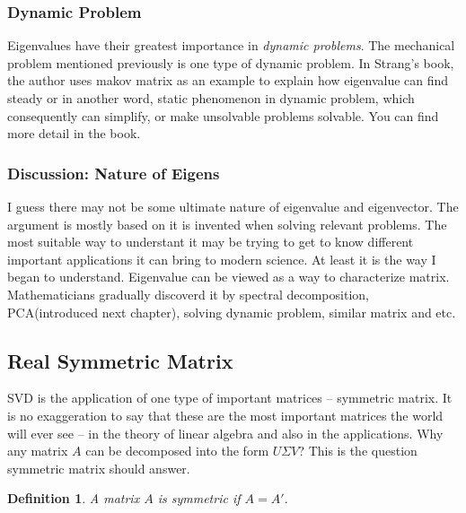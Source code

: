 \documentclass[a4paper]{book}
\newtheorem{definition}{Definition}[section]
\begin{document}
      \subsubsection{Dynamic Problem}

      Eigenvalues have their greatest importance in \textit{dynamic
        problems}\cite{strang2009introduction}. The mechanical problem
      mentioned previously is one type of dynamic problem. In
      Strang's book\cite{strang2009introduction}, the author uses makov
      matrix as an example to explain how eigenvalue can find steady or
      in another word, static phenomenon in dynamic problem, which
      consequently can simplify, or make unsolvable problems solvable.
      You can find more detail in the book.

      \subsubsection{Discussion: Nature of Eigens}

      I guess there may not be some ultimate nature of eigenvalue and
      eigenvector. The argument is mostly based on it is invented when
      solving relevant problems. The most suitable way to understant it
      may be trying to get to know different important applications it
      can bring to modern science. At least it is the way I began to
      understand.  Eigenvalue can be viewed as a way to characterize
      matrix.  Mathematicians gradually discoverd it by spectral decomposition,
      PCA(introduced next chapter), solving dynamic problem, similar
      matrix and etc.


      \subsection{Real Symmetric Matrix}

      SVD is the application of one type of important matrices --
      symmetric matrix. It is no exaggeration to say that these are the
      most important matrices the world will ever see -- in the theory
      of linear algebra and also in the
      applications\cite{strang2009introduction}. Why any matrix $A$ can
      be decomposed into the form $U\Sigma V$? This is the question
      symmetric matrix should answer.

      \begin{definition}
        A matrix $A$ is symmetric if $A = A'$.
      \end{definition}
\end{document}
